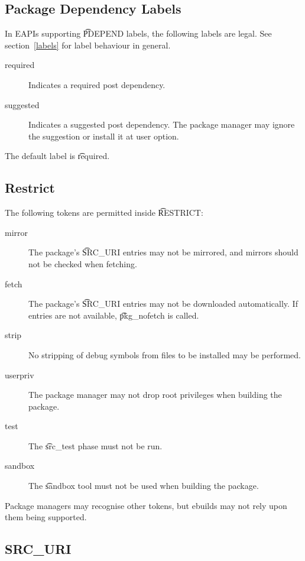 \IFKDEBUILDELSE
{
    \subsection{Package Dependency Labels}

    In EAPIs supporting \t{PDEPEND} labels, the following labels are legal. See
    section~\ref{labels} for label behaviour in general.

    \begin{description}
    \item[required] Indicates a required post dependency.
    \item[suggested] Indicates a suggested post dependency. The package manager may ignore the
        suggestion or install it at user option.
    \end{description}

    The default label is \t{required}.
}{
}

\subsection{Restrict}
\label{restrict}

The following tokens are permitted inside \t{RESTRICT}:

\begin{description}
\item[mirror] The package's \t{SRC\_URI} entries may not be mirrored, and mirrors should not
    be checked when fetching.
\item[fetch] The package's \t{SRC\_URI} entries may not be downloaded automatically. If
    entries are not available, \t{pkg\_nofetch} is called.
\item[strip] No stripping of debug symbols from files to be installed may be performed.
\item[userpriv] The package manager may not drop root privileges when building the package.
\item[test] The \t{src\_test} phase must not be run.
\item[sandbox] The \t{sandbox} tool must not be used when building the package.
\end{description}

Package managers may recognise other tokens, but ebuilds may not rely upon them being supported.

\subsection{SRC\_URI}
\label{src-uri-behaviour}

